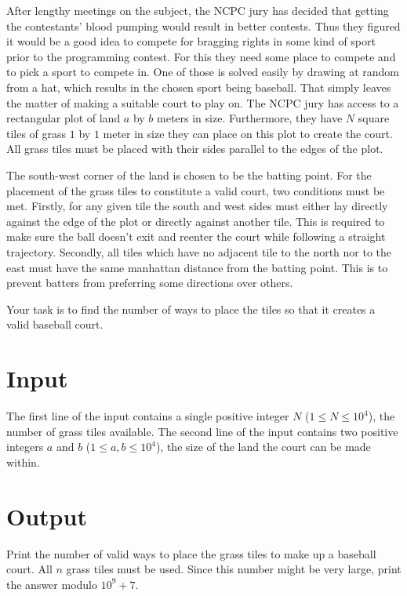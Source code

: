 
After lengthy meetings on the subject, the NCPC jury
has decided that getting the contestants' blood pumping
would result in better contests. Thus they figured it would
be a good idea to compete for bragging rights in some kind of
sport prior to the programming contest. For this they need
some place to compete and to pick a sport to compete in.
One of those is solved easily by drawing at random from a
hat, which results in the chosen sport being baseball.
That simply leaves the matter of making a suitable court
to play on. The NCPC jury has access to a rectangular
plot of land $a$ by $b$ meters in size. Furthermore, they have
$N$ square tiles of grass $1$ by $1$ meter in size 
they can place on this plot to 
create the court. All grass tiles must be placed with their 
sides parallel to the edges of the plot.

The south-west corner of the land is chosen to be the batting point.
For the placement of the grass tiles to constitute a valid
court, two conditions must be met.
Firstly, for any given tile the south and west sides
must either lay directly 
against the edge of the plot or directly against another tile.
This is required to make sure the ball doesn't exit and
reenter the court while following a straight trajectory.
Secondly, all tiles which have no adjacent tile to the
north nor to the east must have the same manhattan 
distance from the batting point.
This is to prevent batters from preferring some directions
over others.

Your task is to find the number of ways to place the tiles so 
that it creates a valid baseball court.

\section*{Input}

The first line of the input contains a single positive
integer $N$ ($1 \leq N \leq 10^4$), the number of grass tiles
available. The second line of the input contains
two positive integers $a$ and $b$ ($1 \leq a, b \leq 10^4$),
the size of the land the court can be made within.

\section*{Output}

Print the number of valid ways to place the grass tiles
to make up a baseball court. All $n$ grass tiles must be used.
Since this number might be very large, print the answer
modulo $10^9 + 7$.
